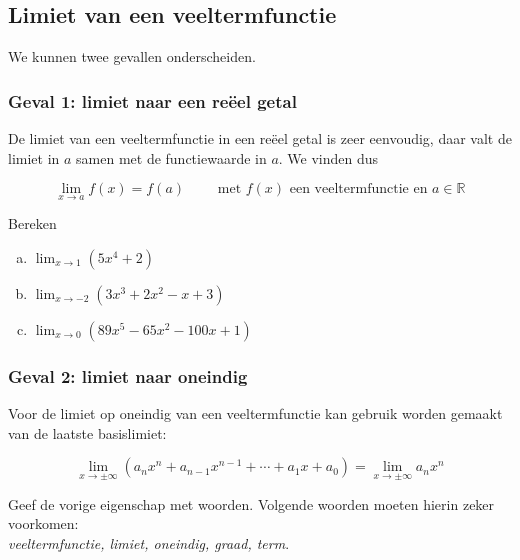 \documentclass[12pt,twoside,a4paper]{article}
\newenvironment{eigenschap}
{
  \vspace{0.4cm}
  \begin{mdframed}[nobreak=true,frametitle={Eigenschap}]
  }{%
  \end{mdframed}
}
\begin{document}
\needspace{4cm}
\subsection{Limiet van een veeltermfunctie}

We kunnen twee gevallen onderscheiden.

\subsubsection*{Geval 1: limiet naar een reëel getal}

De limiet van een veeltermfunctie in een reëel getal is zeer eenvoudig, daar valt de limiet in $a$ samen met de functiewaarde in $a$. We vinden dus

\begin{eigenschap}
  $$\lim_{x\to a}f(x)=f(a) \qquad \mbox{ met $f(x)$ een veeltermfunctie en $a\in\mathbb{R}$}$$
\end{eigenschap}

\begin{oefening}
  Bereken
  \begin{enumerate}[(a)]
  \itemsep.5em
  \item $\displaystyle\lim_{x\to1}\left(5x^4+2\right)$
  \item $\displaystyle\lim_{x\to-2}\left(3x^3+2x^2-x+3\right)$
  \item $\displaystyle\lim_{x\to0}\left(89x^5-65x^2-100x+1\right)$
  \end{enumerate}
\end{oefening}

\subsubsection*{Geval 2: limiet naar oneindig}

Voor de limiet op oneindig van een veeltermfunctie kan gebruik worden gemaakt van de laatste basislimiet:

\begin{eigenschap}
  $$\lim_{x\to\pm\infty}\left(a_nx^n+a_{n-1}x^{n-1}+\cdots+a_1x+a_0\right) = \lim_{x\to\pm\infty}a_nx^n$$
\end{eigenschap}

\begin{oefening}
  Geef de vorige eigenschap met woorden. Volgende woorden moeten hierin zeker voorkomen:\\
  {\em veeltermfunctie, limiet, oneindig, graad, term}.
\end{oefening}
\end{document}
